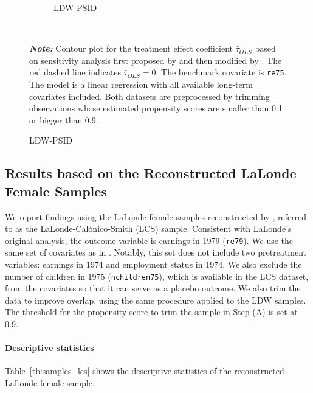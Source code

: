 \documentclass[letterpaper,12pt,leqno]{article}
\begin{document}
\begin{figure}[!ht]
\begin{minipage}[c]{1\textwidth}
\begin{subfigure}{0.45\linewidth}
            \caption{LDW-PSID}
        \end{subfigure}
    \end{minipage}%
    \\\raggedright
     {\footnotesize\textbf{\textit{Note:}} Contour plot for the treatment effect coefficient $\hat{\tau}_{OLS}$ based on sensitivity analysis first proposed by \citet{imbens2003} and then modified by \citet{cinelli2020making}. The red dashed line indicates $\hat\tau_{OLS} = 0$. The benchmark covariate is \texttt{re75}. The model is a linear regression with all available long-term covariates included. Both datasets are preprocessed by trimming observations whose estimated propensity scores are smaller than 0.1 or bigger than 0.9.}
\end{figure}
\clearpage


\subsection{Results based on the Reconstructed LaLonde Female Samples}

We report findings using the LaLonde female samples reconstructed by \citet{calonico2017women}, referred to as the LaLonde-Cal{\'o}nico-Smith (LCS) sample. Consistent with LaLonde's original analysis, the outcome variable is earnings in 1979 (\texttt{re79}). We use the same set of covariates as in \citet{LaLonde}. Notably, this set does not include two pretreatment variables: earnings in 1974 and employment status in 1974. We also exclude the number of children in 1975 (\texttt{nchildren75}), which is available in the LCS dataset, from the covariates so that it can serve as a placebo outcome. We also trim the data to improve overlap, using the same procedure applied to the LDW samples. The threshold for the propensity score to trim the sample in Step (A) is set at 0.9. 

\paragraph{Descriptive statistics} Table~\ref{tb:samples_lcs} shows the descriptive statistics of the reconstructed LaLonde female sample. 
\end{document}

